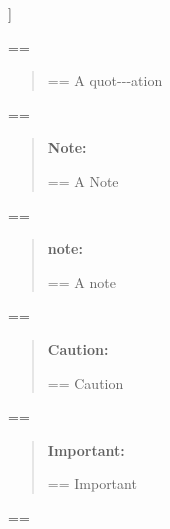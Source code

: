 \documentclass{book}
\makeatletter
\newenvironment{GNUTexinfopreformatted}{%
  \par\GNUTobeylines\obeyspaces\frenchspacing
  \parskip=\z@\parindent=\z@}{}
{\catcode`\^^M=13 \gdef\GNUTobeylines{\catcode`\^^M=13 \def^^M{\null\par}}}
\newenvironment{GNUTexinfoindented}
  {\begin{list}{}{}
  \item\relax}
  {\end{list}}
\makeatother
\begin{document}
\begin{GNUTexinfoindented}
\begin{GNUTexinfoindented}
\begin{description}
{{%
}}]
\end{description}
\end{GNUTexinfoindented}
\begin{GNUTexinfopreformatted}%
\ttfamily 
\end{GNUTexinfopreformatted}
\begin{quote}
\begin{GNUTexinfopreformatted}%
\ttfamily A quot{-}{-}{-}ation
\end{GNUTexinfopreformatted}
\end{quote}
\begin{GNUTexinfopreformatted}%
\ttfamily 
\end{GNUTexinfopreformatted}
\begin{quote}
\textbf{Note:} \begin{GNUTexinfopreformatted}%
\ttfamily A Note
\end{GNUTexinfopreformatted}
\end{quote}
\begin{GNUTexinfopreformatted}%
\ttfamily 
\end{GNUTexinfopreformatted}
\begin{quote}
\textbf{note:} \begin{GNUTexinfopreformatted}%
\ttfamily A note
\end{GNUTexinfopreformatted}
\end{quote}
\begin{GNUTexinfopreformatted}%
\ttfamily 
\end{GNUTexinfopreformatted}
\begin{quote}
\textbf{Caution:} \begin{GNUTexinfopreformatted}%
\ttfamily Caution
\end{GNUTexinfopreformatted}
\end{quote}
\begin{GNUTexinfopreformatted}%
\ttfamily 
\end{GNUTexinfopreformatted}
\begin{quote}
\textbf{Important:} \begin{GNUTexinfopreformatted}%
\ttfamily Important
\end{GNUTexinfopreformatted}
\end{quote}
\begin{GNUTexinfopreformatted}%
\ttfamily 
\end{GNUTexinfopreformatted}
\begin{quote}

\end{quote}
\end{GNUTexinfoindented}
\end{document}
